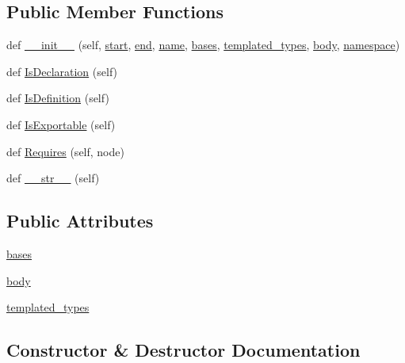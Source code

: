\subsection*{Public Member Functions}
\begin{DoxyCompactItemize}
\item 
def \hyperlink{classcpp_1_1ast_1_1Class_acc17c34512d5cc54d5125734ce79f219}{\+\_\+\+\_\+init\+\_\+\+\_\+} (self, \hyperlink{classcpp_1_1ast_1_1Node_a7b2aa97e6a049bb1a93aea48c48f1f44}{start}, \hyperlink{classcpp_1_1ast_1_1Node_a3c5e5246ccf619df28eca02e29d69647}{end}, \hyperlink{classcpp_1_1ast_1_1__GenericDeclaration_af774f4729dfd78d0538a6782fe8514c1}{name}, \hyperlink{classcpp_1_1ast_1_1Class_a5665eb67314a075d4e0ff91accbde5d1}{bases}, \hyperlink{classcpp_1_1ast_1_1Class_a48ed0d3115656554d9134bc1787390fa}{templated\+\_\+types}, \hyperlink{classcpp_1_1ast_1_1Class_add39f61fdcf6dae42d79cac3dcbb7782}{body}, \hyperlink{classcpp_1_1ast_1_1__GenericDeclaration_a8aee3f11b37449d54b42a78e0a689f46}{namespace})
\item 
def \hyperlink{classcpp_1_1ast_1_1Class_a4758bfb7c00410575932974e1ed8b7da}{Is\+Declaration} (self)
\item 
def \hyperlink{classcpp_1_1ast_1_1Class_ae6d2356f835d06d5109d9e4609d86780}{Is\+Definition} (self)
\item 
def \hyperlink{classcpp_1_1ast_1_1Class_a1ab749f8cfddb0903c6484791f70f42e}{Is\+Exportable} (self)
\item 
def \hyperlink{classcpp_1_1ast_1_1Class_a347673e0a2a7b840b7d2d1cae13977f7}{Requires} (self, node)
\item 
def \hyperlink{classcpp_1_1ast_1_1Class_a0a63f6fab75d61ffac6fb9f1c29ae84d}{\+\_\+\+\_\+str\+\_\+\+\_\+} (self)
\end{DoxyCompactItemize}
\subsection*{Public Attributes}
\begin{DoxyCompactItemize}
\item 
\hyperlink{classcpp_1_1ast_1_1Class_a5665eb67314a075d4e0ff91accbde5d1}{bases}
\item 
\hyperlink{classcpp_1_1ast_1_1Class_add39f61fdcf6dae42d79cac3dcbb7782}{body}
\item 
\hyperlink{classcpp_1_1ast_1_1Class_a48ed0d3115656554d9134bc1787390fa}{templated\+\_\+types}
\end{DoxyCompactItemize}


\subsection{Constructor \& Destructor Documentation}
